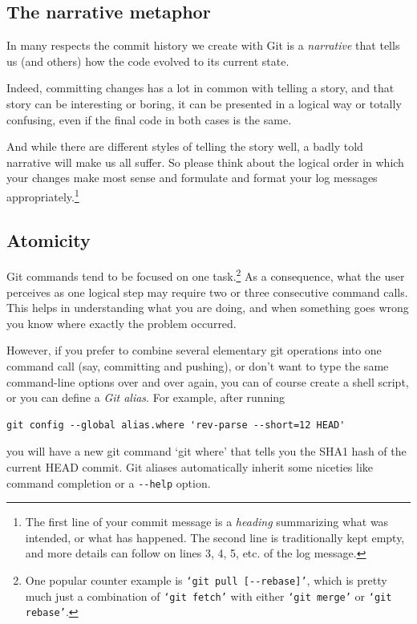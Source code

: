 \documentclass[12pt,pdftex]{article}
\begin{document}
\subsection{The narrative metaphor}
\label{sec-2-4}

In many respects the commit history we create with Git is a \emph{narrative}
that tells us (and others) how the code evolved to its current state.

Indeed, committing changes has a lot in common with telling a story,
and that story can be interesting or boring, it can be presented in a
logical way or totally confusing, even if the final code in both cases
is the same.

And while there are different styles of telling the story well, a badly
told narrative will make us all suffer.
So please think about the logical order in which your changes make most
sense and formulate and format your log messages appropriately.\footnote{The first line of your commit message is a \emph{heading} summarizing
what was intended, or what has happened.
The second line is traditionally kept empty, and more details can follow
on lines 3, 4, 5, etc. of the log message.}


\subsection{Atomicity}
\label{sec-2-5}

Git commands tend to be focused on one task.\footnote{One popular counter example is \texttt{‘git pull [-{}-rebase]’}, which is
pretty much just a combination of \texttt{‘git fetch’} with either \texttt{‘git merge’}
or \texttt{‘git rebase’}.}
As a consequence, what the user perceives as one logical step may
require two or three consecutive command calls.
This helps in understanding what you are doing, and when something
goes wrong you know where exactly the problem occurred.

However, if you prefer to combine several elementary git operations
into one command call (say, committing and pushing), or don't want to
type the same command-line options over and over again, you can of
course create a shell script, or you can define a \emph{Git alias}.
For example, after running
\lstset{frame=single,basicstyle=\ttfamily\footnotesize,language=sh,label= ,caption= ,captionpos=b,numbers=none}
\begin{lstlisting}
git config --global alias.where 'rev-parse --short=12 HEAD'
\end{lstlisting}
you will have a new git command ‘git where’ that tells you the SHA1
hash of the current HEAD commit.
Git aliases automatically inherit some niceties like command completion
or a \texttt{-{}-help} option.
\end{document}
